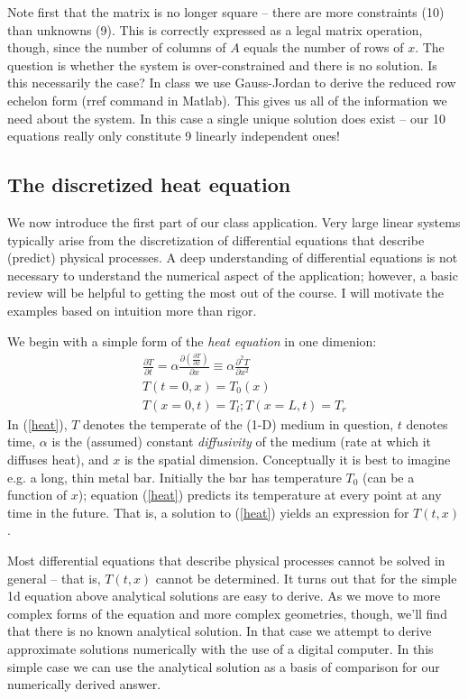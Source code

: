 \documentclass[11pt]{article}
\begin{document}
Note first that the matrix is no longer square -- there are more constraints (10) than unknowns (9). This 
is correctly expressed as a legal matrix operation, though, since the number of columns of $A$ equals the
number of rows of $x$. The question is whether the system is over-constrained and there is no solution.
Is this necessarily the case? In class we use Gauss-Jordan to derive the reduced row echelon form (rref
command in Matlab). This gives us all of the information we need about the system. In this case a single
unique solution does exist -- our 10 equations really only constitute 9 linearly independent ones!

\subsection{The discretized heat equation}
We now introduce the first part of our class application. Very large linear systems typically arise
from the discretization of differential equations that describe (predict) physical processes. A deep
understanding of differential equations is not necessary to understand the numerical aspect of the
application; however, a basic review will be helpful to getting the most out of the course. I will motivate
the examples based on intuition more than rigor.

We begin with a simple form of the {\em heat equation} in one dimenion:
\begin{eqnarray}
\label{heat}
& & \frac{\partial T}{\partial t} = \alpha \frac{\partial (\frac{\partial T}{\partial x})      } {\partial x} \equiv \alpha \frac{\partial^2 T}{\partial x^2} \\
& & T(t=0,x) =  T_0(x)  \nonumber \\ 
& & T(x=0,t) = T_l; T(x=L,t) = T_r \nonumber
\end{eqnarray}
 In (\ref{heat}), $T$ denotes the temperate of the (1-D) medium in question, $t$ denotes time, $\alpha$ is the (assumed) constant
 {\em diffusivity} of the medium (rate at which it diffuses heat), and $x$ is the spatial dimension. Conceptually it is best to imagine
 e.g. a long, thin metal bar. Initially the bar has temperature $T_0$ (can be a function of $x$); equation (\ref{heat}) predicts its
 temperature at every point at any time in the future. That is, a solution to (\ref{heat}) yields an expression for $T(t,x)$.
 
 Most differential equations that describe physical processes cannot be solved in general -- that is, $T(t,x)$ cannot be determined.
 It turns out that for the simple 1d equation above analytical solutions are easy to derive. As we move to more complex forms
 of the equation and more complex geometries, though, we'll find that there is no known analytical solution. In that case we
 attempt to derive approximate solutions numerically with the use of a digital computer. In this simple case we can use the analytical
 solution as a basis of comparison for our numerically derived answer.
 
\end{document}
